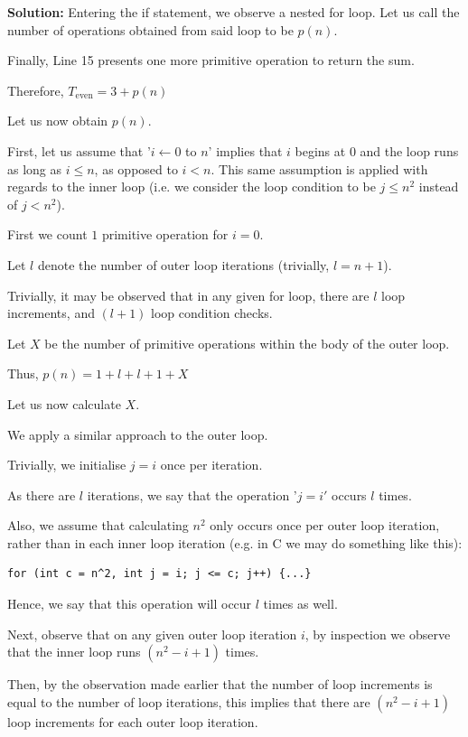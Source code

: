 \documentclass[a4,13pt]{extarticle}
\newenvironment{Solution}{\color{blue}\textbf{Solution:}}{}
\begin{document}
\begin{enumerate}
\begin{enumerate}
\begin{Solution}
Entering the if statement, we observe a nested for loop. Let us call the number of operations obtained from said loop to be $p(n)$.

Finally, Line 15 presents one more primitive operation to return the sum.

Therefore, $T_{\text{even}}=3+p(n)$

Let us now obtain $p(n)$.

First, let us assume that '$i\gets0$ to $n$' implies that $i$ begins at $0$ and the loop runs as long as $i\le n$, as opposed to $i<n$. This same assumption is applied with regards to the inner loop (i.e. we consider the loop condition to be $j\le n^2$ instead of $j<n^2$).

First we count $1$ primitive operation for $i=0$.

Let $l$ denote the number of outer loop iterations (trivially, $l=n+1$).

Trivially, it may be observed that in any given for loop, there are $l$ loop increments, and $(l+1)$ loop condition checks.

Let $X$ be the number of primitive operations within the body of the outer loop.

Thus, $p(n)=1+l+l+1+X$

Let us now calculate $X$.

We apply a similar approach to the outer loop.

Trivially, we initialise $j=i$ once per iteration.

As there are $l$ iterations, we say that the operation '$j=i'$ occurs $l$ times.

Also, we assume that calculating $n^2$ only occurs once per outer loop iteration, rather than in each inner loop iteration (e.g. in C we may do something like this):

\begin{lstlisting}
for (int c = n^2, int j = i; j <= c; j++) {...}
\end{lstlisting}

Hence, we say that this operation will occur $l$ times as well.

Next, observe that on any given outer loop iteration $i$, by inspection we observe that the inner loop runs $(n^2-i+1)$ times.

Then, by the observation made earlier that the number of loop increments is equal to the number of loop iterations, this implies that there are $(n^2-i+1)$ loop increments for each outer loop iteration.


\end{Solution}
\end{enumerate}
\end{enumerate}
\end{document}
